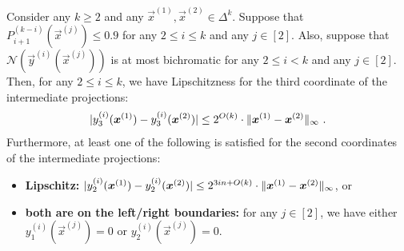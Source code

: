 \begin{lemma}
\label{lem:intermediate-projections-are-close-to-each-other-symmetry}
    Consider any $k\geq 2$ and any $\vec{x}^{(1)}, \vec{x}^{(2)}\in \Delta^k$.
    Suppose that $P_{i+1}^{(k-i)}(\vec{x}^{(j)})\leq 0.9$ for any $2\leq i\leq k$ and any $j\in [2]$.
    Also, suppose that $\mathcal{N}(\vec{y}^{(i)}(\vec{x}^{(j)}))$ is at most bichromatic for any $2\leq i<k$ and any $j\in [2]$.
    Then, for any $2\leq i\leq k$, we have Lipschitzness for the third coordinate of the intermediate projections:
    \begin{align*}
        |{y^{(i)}_3(\boldsymbol{x}^{(1)})-y^{(i)}_3(\boldsymbol{x}^{(2)})} |\leq 2^{O(k)}\cdot \| {\boldsymbol{x}^{(1)}-\boldsymbol{x}^{(2)}} \|_{\infty}~.
    \end{align*}
    Furthermore, at least one of the following is satisfied for the second coordinates of the intermediate projections:
    \begin{itemize}[itemsep=0.1em, topsep=0.4em]
        \item {\bf Lipschitz:} $|{y_2^{(i)}(\boldsymbol{x}^{(1)})-y_2^{(i)}(\boldsymbol{x}^{(2)})} |\leq 2^{3in+O(k)}\cdot \| {\boldsymbol{x}^{(1)}-\boldsymbol{x}^{(2)}} \|_{\infty}$, or
        \item {\bf both are on the left/right boundaries:} for any $j\in [2]$, we have either $y_1^{(i)}(\vec{x}^{(j)})=0$ or $y_2^{(i)}(\vec{x}^{(j)})=0$.
    \end{itemize}
\end{lemma}
